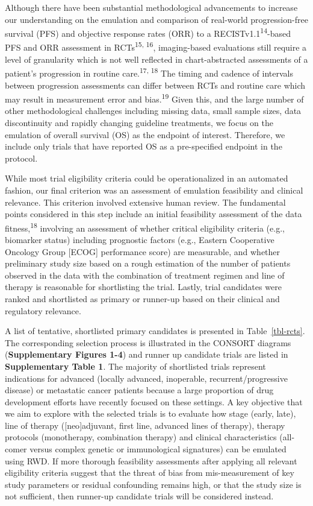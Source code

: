\documentclass[
  letterpaper,
  DIV=11,
  numbers=noendperiod]{scrartcl}
\begin{document}
Although there have been substantial methodological advancements to
increase our understanding on the emulation and comparison of real-world
progression-free survival (PFS) and objective response rates (ORR) to a
RECISTv1.1\textsuperscript{14}-based PFS and ORR assessment in
RCTs\textsuperscript{15, 16}, imaging-based evaluations still require a
level of granularity which is not well reflected in chart-abstracted
assessments of a patient's progression in routine
care.\textsuperscript{17, 18} The timing and cadence of intervals
between progression assessments can differ between RCTs and routine care
which may result in measurement error and bias.\textsuperscript{19}
Given this, and the large number of other methodological challenges
including missing data, small sample sizes, data discontinuity and
rapidly changing guideline treatments, we focus on the emulation of
overall survival (OS) as the endpoint of interest. Therefore, we include
only trials that have reported OS as a pre-specified endpoint in the
protocol.

While most trial eligibility criteria could be operationalized in an
automated fashion, our final criterion was an assessment of emulation
feasibility and clinical relevance. This criterion involved extensive
human review. The fundamental points considered in this step include an
initial feasibility assessment of the data fitness,\textsuperscript{18}
involving an assessment of whether critical eligibility criteria (e.g.,
biomarker status) including prognostic factors (e.g., Eastern
Cooperative Oncology Group {[}ECOG{]} performance score) are measurable,
and whether preliminary study size based on a rough estimation of the
number of patients observed in the data with the combination of
treatment regimen and line of therapy is reasonable for shortlisting the
trial. Lastly, trial candidates were ranked and shortlisted as primary
or runner-up based on their clinical and regulatory relevance.

A list of tentative, shortlisted primary candidates is presented in
Table~\ref{tbl-rcts}. The corresponding selection process is illustrated
in the CONSORT diagrams (\textbf{Supplementary Figures 1-4}) and runner
up candidate trials are listed in \textbf{Supplementary Table 1}. The
majority of shortlisted trials represent indications for advanced
(locally advanced, inoperable, recurrent/progressive disease) or
metastatic cancer patients because a large proportion of drug
development efforts have recently focused on these settings. A key
objective that we aim to explore with the selected trials is to evaluate
how stage (early, late), line of therapy ({[}neo{]}adjuvant, first line,
advanced lines of therapy), therapy protocols (monotherapy, combination
therapy) and clinical characteristics (all-comer versus complex genetic
or immunological signatures) can be emulated using RWD. If more thorough
feasibility assessments after applying all relevant eligibility criteria
suggest that the threat of bias from mis-measurement of key study
parameters or residual confounding remains high, or that the study size
is not sufficient, then runner-up candidate trials will be considered
instead.
\end{document}
